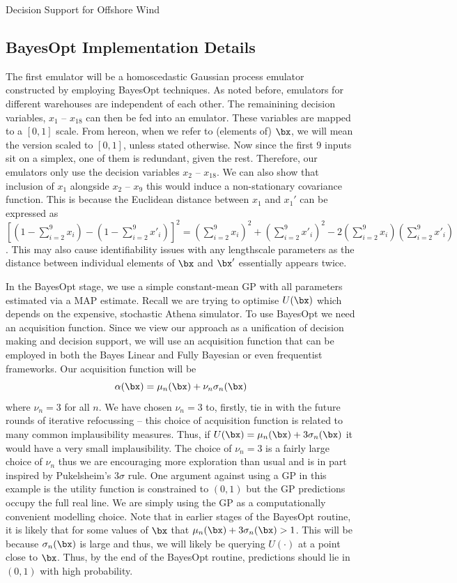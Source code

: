 \begin{chapter}{Decision Support for Offshore Wind \label{Ch:ds-for-ow}}
\subsection{BayesOpt Implementation Details}
The first emulator will be a homoscedastic Gaussian process emulator constructed by employing BayesOpt techniques. As noted before, emulators for different warehouses are independent of each other. The remainining decision variables, $x_1$ -- $x_{18}$ can then be fed into an emulator. These variables are mapped to a $[0,1]$ scale. From hereon, when we refer to (elements of) $\bx$, we will mean the version scaled to $[0,1]$, unless stated otherwise. Now since the first $9$ inputs sit on a simplex, one of them is redundant, given the rest. Therefore, our emulators only use the decision variables $x_2$ -- $x_{18}$. We can also show that inclusion of $x_1$ alongside $x_2$ -- $x_9$ this would induce a non-stationary covariance function. This is because the Euclidean distance between $x_1$ and $x_1'$ can be expressed as $\left[ (1 - \sum_{i=2}^9 x_i) - (1 - \sum_{i=2}^9 x'_i)  \right]^2  = (\sum_{i=2}^9 x_i)^2 + (\sum_{i=2}^9 x'_i)^2 - 2(\sum_{i=2}^9 x_i)(\sum_{i=2}^9 x'_i)$. This may also cause identifiability issues with any lengthscale parameters as the distance between individual elements of $\bx$ and $\bx'$ essentially appears twice.

 In the BayesOpt stage, we use a simple constant-mean GP with all parameters estimated via a MAP estimate. Recall we are trying to optimise $U(\bx)$ which depends on the expensive, stochastic Athena simulator.
To use BayesOpt we need an acquisition function. Since we view our approach as a unification of decision making and decision support, we will use an acquisition function that can be employed in both the Bayes Linear and Fully Bayesian or even frequentist frameworks. Our acquisition function will be
\begin{equation}
  \alpha(\bx) = \mu_n(\bx) + \nu_n \sigma_n(\bx)
\end{equation}
where $\nu_n = 3$ for all $n$. We have chosen $\nu_n = 3$ to, firstly, tie in with the future rounds of iterative refocussing -- this choice of acquisition function is related to many common implausibility measures. Thus, if $U(\bx)  = \mu_n(\bx) + 3 \sigma_n(\bx)$ it would have a very small implausibility. The choice of $\nu_n = 3$ is a fairly large choice of $\nu_n$ thus we are encouraging more exploration than usual and is in part inspired by Pukelsheim's $3\sigma$ rule. One argument against using a GP in this example is the utility function is constrained to $(0,1)$ but the GP predictions occupy the full real line. We are simply using the GP as a computationally convenient modelling choice. Note that  in earlier stages of the BayesOpt routine, it is likely that for some values of $\bx$ that $\mu_n(\bx) + 3 \sigma_n(\bx)  > 1$. This will be because $\sigma_n(\bx)$ is large and thus, we will likely be querying $U(\cdot)$ at a point close to $\bx$. Thus, by the end of the BayesOpt routine, predictions should lie in $(0,1)$ with high probability.


\end{chapter}
